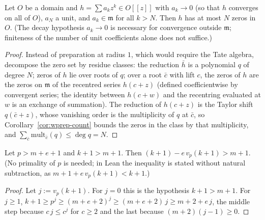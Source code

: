 \begin{theorem}[Strassmann]
\label{thm:strassmann}
\leanok
{}
Let $O$ be a domain and $h = \sum a_k z^k \in O[[z]]$ with $a_k \to 0$ (so that $h$
converges on all of $O$), $a_N$ a unit, and $a_k \in \mathfrak m$ for all $k > N$. Then
$h$ has at most $N$ zeros in $O$. (The decay hypothesis $a_k \to 0$ is necessary for
convergence outside $\mathfrak m$; finiteness of the number of unit coefficients alone
does not suffice.)
\end{theorem}
\begin{proof}
\leanok
Instead of preparation at radius $1$, which would require the Tate algebra, decompose
the zero set by residue classes: the reduction $\bar h$ is a polynomial $q$ of degree
$N$; zeros of $h$ lie over roots of $q$; over a root $\bar c$ with lift $c$, the zeros
of $h$ are the zeros on $\mathfrak m$ of the recentred series $h(c + z)$ (defined
coefficientwise by convergent series; the identity between $h(c+w)$ and the recentring
evaluated at $w$ is an exchange of summation). The reduction of $h(c + z)$ is the
Taylor shift $q(\bar c + z)$, whose vanishing order is the multiplicity of $q$ at
$\bar c$, so Corollary~\ref{cor:wprep-count} bounds the zeros in the class by that
multiplicity, and $\sum_{\bar c} \mathrm{mult}_{\bar c}(q) \le \deg q = N$.
\end{proof}

\begin{lemma}
\label{lem:padic-index}
\leanok
Let $p > m + e + 1$ and $k + 1 > m + 1$. Then $(k+1) - e\,v_p(k+1) > m + 1$. (No primality
of $p$ is needed; in Lean the inequality is stated without natural subtraction, as
$m + 1 + e\,v_p(k+1) < k+1$.)
\end{lemma}
\begin{proof}
\leanok
Let $j := v_p(k+1)$. For $j = 0$ this is the hypothesis $k + 1 > m + 1$. For $j \ge 1$,
$k + 1 \ge p^j \ge (m+e+2)^j \ge (m+e+2)\,j \ge m + 2 + e\,j$, the middle step because
$c\,j \le c^j$ for $c \ge 2$ and the last because $(m+2)(j-1) \ge 0$.
\end{proof}


